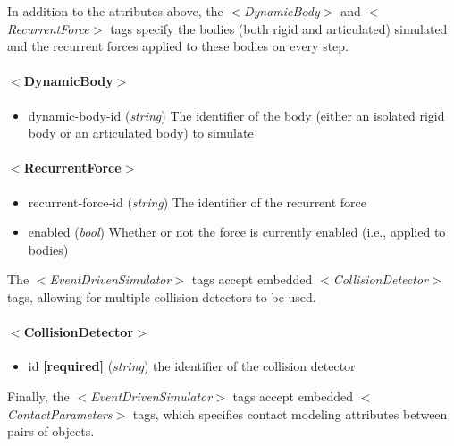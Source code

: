 \documentclass{article}
\begin{document}
\begin{landscape}
\begin{itemize}
In addition to the attributes above, the $<$\emph{DynamicBody}$>$ and $<$\emph{RecurrentForce}$>$ tags specify the bodies (both rigid and articulated) simulated and the recurrent forces applied to these bodies on every step.

\paragraph{$<$DynamicBody$>$}
\begin{itemize}
\item dynamic-body-id  (\emph{string}) The identifier of the body (either an isolated rigid body or an articulated body) to simulate
\end{itemize}

\paragraph{$<$RecurrentForce$>$}
\begin{itemize}
\item recurrent-force-id  (\emph{string}) The identifier of the recurrent force
\item enabled  (\emph{bool}) Whether or not the force is currently enabled (i.e., applied to bodies)
\end{itemize}

The $<$\emph{EventDrivenSimulator}$>$ tags accept embedded $<$\emph{CollisionDetector}$>$ tags, allowing for multiple collision detectors to be used.

\paragraph{$<$CollisionDetector$>$}
\begin{itemize}
\item id  \textbf{[required]} (\emph{string}) the identifier of the collision detector
\end{itemize}

Finally, the $<$\emph{EventDrivenSimulator}$>$ tags accept embedded $<$\emph{ContactParameters}$>$ tags, which specifies contact modeling attributes between pairs of objects.


\end{itemize}
\end{landscape}
\end{document}
